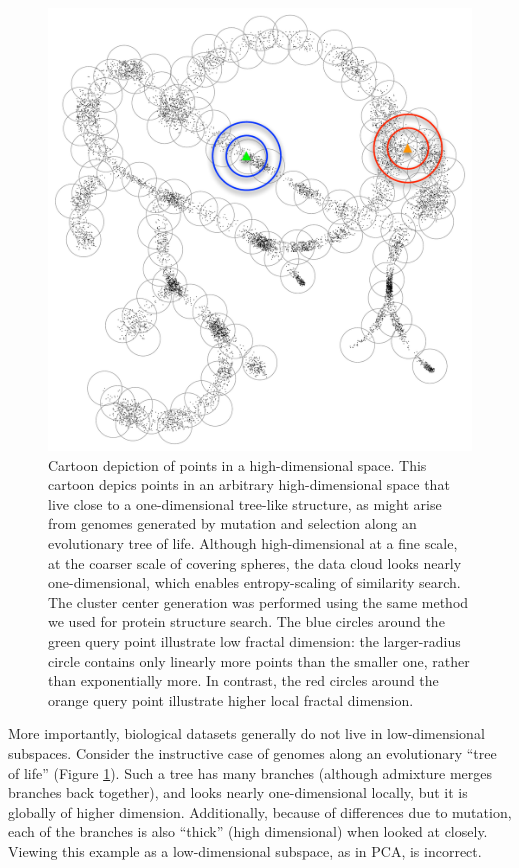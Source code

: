 \documentclass[11pt]{elsarticle}
\theoremstyle{definition}
\theoremstyle{remark}
\numberwithin{equation}{section}
\begin{document}
\begin{figure}[p]
    \vspace{-5em}
    \centering
    \centerline{\includegraphics[width=6in]{assets/treepoints/treepoints-2D-clusters-conc.pdf}}
    \caption{Cartoon depiction of points in a high-dimensional space. %
        This cartoon depics points in an arbitrary high-dimensional space that live close to a one-dimensional tree-like structure, as might arise from genomes generated by mutation and selection along an evolutionary tree of life. %
Although high-dimensional at a fine scale, at the coarser scale of covering spheres, the data cloud looks nearly one-dimensional, which enables entropy-scaling of similarity search. The cluster center generation was performed using the same method we used for protein structure search. %
The blue circles around the green query point illustrate low fractal dimension: the larger-radius circle contains only linearly more points than the smaller one, rather than exponentially more. In contrast, the red circles around the orange query point illustrate higher local fractal dimension.}
    \label{fig:tree}
\end{figure}

More importantly, biological datasets generally do not live in low-dimensional subspaces.
Consider the instructive case of genomes along an evolutionary ``tree of life'' (Figure \ref{fig:tree}).
Such a tree has many branches (although admixture merges branches back together),
and looks nearly one-dimensional locally, but it is globally of higher dimension.
Additionally, because of differences due to mutation, each of the branches is also ``thick'' (high dimensional) when looked at closely.
Viewing this example as a low-dimensional subspace, as in PCA, is 
incorrect.
\end{document}
